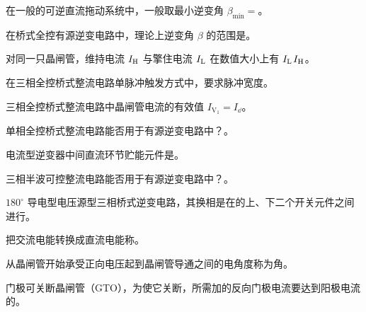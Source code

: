 \documentclass[电力电子]{subfiles}
\begin{document}
\begin{ti}
	在一般的可逆直流拖动系统中，一般取最小逆变角 $\beta_{\min} = $。
\end{ti}

\begin{ti}
	在桥式全控有源逆变电路中，理论上逆变角 $\beta$ 的范围是。
\end{ti}

\begin{ti}
	对同一只晶闸管，维持电流 $I_{\mathrm{H}}$ 与擎住电流 $I_{\mathrm{L}}$ 在数值大小上有 $I_{\mathrm{L}}$\hua{$<$}$I_{\mathrm{H}}$。
\end{ti}

\begin{ti}
	在三相全控桥式整流电路单脉冲触发方式中，要求脉冲宽度。
\end{ti}

\begin{ti}
	三相全控桥式整流电路中晶闸管电流的有效值 $I_{\mathrm{V}_{1}} = $$I_{\dd}$。
\end{ti}

\begin{ti}
	单相全控桥式整流电路能否用于有源逆变电路中？。
\end{ti}

\begin{ti}
	电流型逆变器中间直流环节贮能元件是。
\end{ti}

\begin{ti}
	三相半波可控整流电路能否用于有源逆变电路中？。
\end{ti}

\begin{ti}
	$180^\circ$ 导电型电压源型三相桥式逆变电路，其换相是在的上、下二个开关元件之间进行。
\end{ti}

\begin{ti}
	把交流电能转换成直流电能称。
\end{ti}

\begin{ti}
	从晶闸管开始承受正向电压起到晶闸管导通之间的电角度称为角。
\end{ti}

\begin{ti}
	门极可关断晶闸管（GTO），为使它关断，所需加的反向门极电流要达到阳极电流的。
\end{ti}
\end{document}
